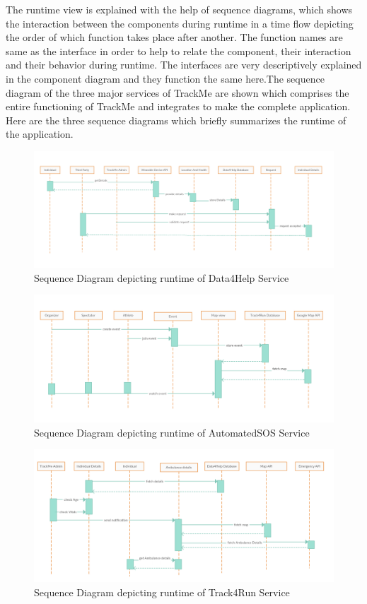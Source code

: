 The runtime view is explained with the help of sequence diagrams, which shows the interaction between the components during runtime in a time flow depicting the order of which function takes place after another. The function names are same as the interface in order to help to relate the component, their interaction and their behavior during runtime. The interfaces are very descriptively explained in the component  diagram and they function the same here.The sequence diagram of the three major services of TrackMe are shown which comprises the entire functioning of TrackMe and integrates to make the complete application.\newline
Here are the three sequence diagrams which briefly summarizes the runtime of the application.
\begin{figure}[H]
	\begin{center}
		\includegraphics[width=\textwidth]{./DD_Diagrams/RuntimeData4Help.png}
      \caption{Sequence Diagram depicting runtime of Data4Help Service}
        \label{TrackMe_r1}
	\end{center}
\end{figure}
\begin{figure}[H]
	\begin{center}
		\includegraphics[width=\textwidth]{./DD_Diagrams/RuntimeAutomatedSOS.png}
      \caption{Sequence Diagram depicting runtime of AutomatedSOS Service}
        \label{TrackMe_r2}
	\end{center}
\end{figure}
\begin{figure}[H]
	\begin{center}
		\includegraphics[width=\textwidth]{./DD_Diagrams/RuntimeTrack4Run.png}
      \caption{Sequence Diagram depicting runtime of Track4Run Service}
        \label{TrackMe_r3}
	\end{center}
\end{figure}
